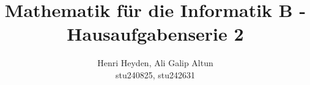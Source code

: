 \documentclass[12pt, a4paper]{article}
\title{Mathematik für die Informatik B - Hausaufgabenserie 2}
\author{Henri Heyden, Ali Galip Altun \\ \small stu240825, stu242631}
\date{}
\begin{document}
\maketitle


\doublespacing
\end{document}
